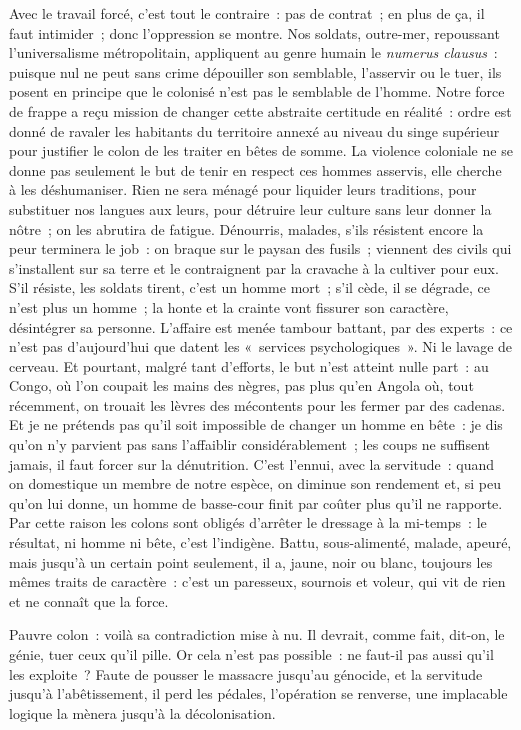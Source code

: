\documentclass[french,twoside]{book} %
\begin{document}
Avec le travail forcé, c’est tout le contraire : pas de contrat ; en plus de ça, il faut intimider ; donc l’oppression se montre. Nos soldats, outre-mer, repoussant l’universalisme métropolitain, appliquent au genre humain le \emph{numerus clausus} : puisque nul ne peut sans crime dépouiller son semblable, l’asservir ou le tuer, ils posent en principe que le colonisé n’est pas le semblable de l’homme. Notre force de frappe a reçu mission de changer cette abstraite certitude en réalité : ordre est donné de ravaler les habitants du territoire annexé au niveau du singe supérieur pour justifier le colon de les traiter en bêtes de somme. La violence coloniale ne se donne pas seulement le but de tenir en respect ces hommes asservis, elle cherche à les déshumaniser. Rien ne   sera ménagé pour liquider leurs traditions, pour substituer nos langues aux leurs, pour détruire leur culture sans leur donner la nôtre ; on les abrutira de fatigue. Dénourris, malades, s’ils résistent encore la peur terminera le job : on braque sur le paysan des fusils ; viennent des civils qui s’installent sur sa terre et le contraignent par la cravache à la cultiver pour eux. S’il résiste, les soldats tirent, c’est un homme mort ; s’il cède, il se dégrade, ce n’est plus un homme ; la honte et la crainte vont fissurer son caractère, désintégrer sa personne. L’affaire est menée tambour battant, par des experts : ce n’est pas d’aujourd’hui que datent les « services psychologiques ». Ni le lavage de cerveau. Et pourtant, malgré tant d’efforts, le but n’est atteint nulle part : au Congo, où l’on coupait les mains des nègres, pas plus qu’en Angola où, tout récemment, on trouait les lèvres des mécontents pour les fermer par des cadenas. Et je ne prétends pas qu’il soit impossible de changer un homme en bête : je dis qu’on n’y parvient pas sans l’affaiblir considérablement ; les coups ne suffisent jamais, il faut forcer sur la dénutrition. C’est l’ennui, avec la servitude : quand on domestique un membre de notre espèce, on diminue son rendement et, si peu qu’on lui donne, un homme de basse-cour finit par coûter plus qu’il ne rapporte. Par cette raison les colons sont obligés d’arrêter le dressage à la mi-temps : le résultat, ni homme ni bête, c’est l’indigène. Battu, sous-alimenté, malade, apeuré, mais jusqu’à un certain point seulement, il a, jaune, noir ou blanc, toujours les mêmes traits de caractère : c’est un paresseux, sournois et voleur, qui vit de rien et ne connaît que la force.\par
Pauvre colon : voilà sa contradiction mise à nu. Il devrait, comme fait, dit-on, le génie, tuer ceux qu’il pille. Or cela n’est pas possible : ne faut-il pas aussi qu’il les exploite ? Faute de pousser le massacre jusqu’au génocide, et la servitude jusqu’à l’abêtissement, il perd les pédales, l’opération se renverse, une implacable logique la mènera jusqu’à la décolonisation.\par
\end{document}

